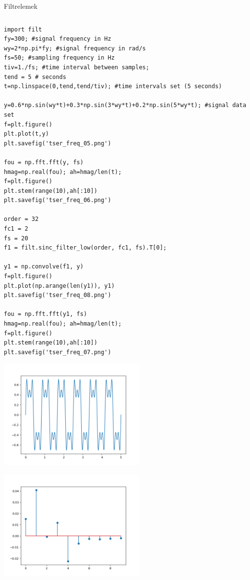 \documentclass[12pt,fleqn]{article}\usepackage{../../common}
\begin{document}
Filtrelemek

\inputminted[fontsize=\footnotesize]{python}{filt.py}

\begin{verbatim}
import filt
fy=300; #signal frequency in Hz
wy=2*np.pi*fy; #signal frequency in rad/s
fs=50; #sampling frequency in Hz
tiv=1./fs; #time interval between samples;
tend = 5 # seconds
t=np.linspace(0,tend,tend/tiv); #time intervals set (5 seconds)

y=0.6*np.sin(wy*t)+0.3*np.sin(3*wy*t)+0.2*np.sin(5*wy*t); #signal data set
f=plt.figure()
plt.plot(t,y)
plt.savefig('tser_freq_05.png')

fou = np.fft.fft(y, fs)
hmag=np.real(fou); ah=hmag/len(t);
f=plt.figure()
plt.stem(range(10),ah[:10])
plt.savefig('tser_freq_06.png')

order = 32
fc1 = 2
fs = 20
f1 = filt.sinc_filter_low(order, fc1, fs).T[0];

y1 = np.convolve(f1, y)
f=plt.figure()
plt.plot(np.arange(len(y1)), y1)
plt.savefig('tser_freq_08.png')

fou = np.fft.fft(y1, fs)
hmag=np.real(fou); ah=hmag/len(t);
f=plt.figure()
plt.stem(range(10),ah[:10])
plt.savefig('tser_freq_07.png')
\end{verbatim}

\includegraphics[width=20em]{tser_freq_05.png}

\includegraphics[width=20em]{tser_freq_06.png}
\end{document}
